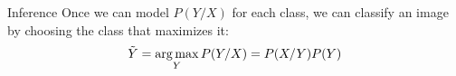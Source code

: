 \bgroup  
\begin{frame}{Inference}
Once we can model $P(Y/X)$ for each class, we can classify an image by choosing the class that maximizes it:
\begin{equation*}
\tilde{Y} = \operatorname*{arg\,max}_{Y} P(Y/X) = P(X/Y)P(Y)
\end{equation*}
\end{frame}
\egroup